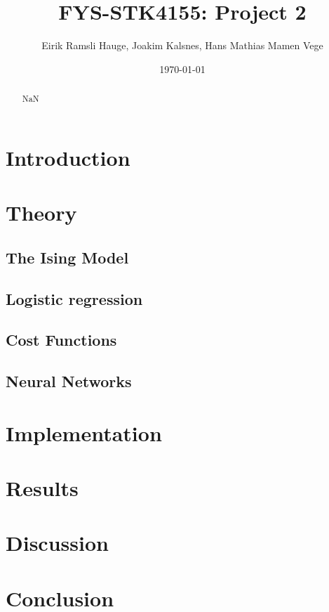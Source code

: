 \documentclass[11pt]{article}
\title{FYS-STK4155: Project 2}
\author{Eirik Ramsli Hauge, Joakim Kalsnes, Hans Mathias Mamen Vege}
\date{\today}
\begin{document}
\maketitle

\begin{abstract}
NaN
\end{abstract}

\tableofcontents

\section{Introduction}


\section{Theory}
\subsection{The Ising Model}


\subsection{Logistic regression}


\subsection{Cost Functions}


\subsection{Neural Networks}


\section{Implementation}


\section{Results}


\section{Discussion}


\section{Conclusion}


\begin{appendices}

\end{appendices}



\end{document}
